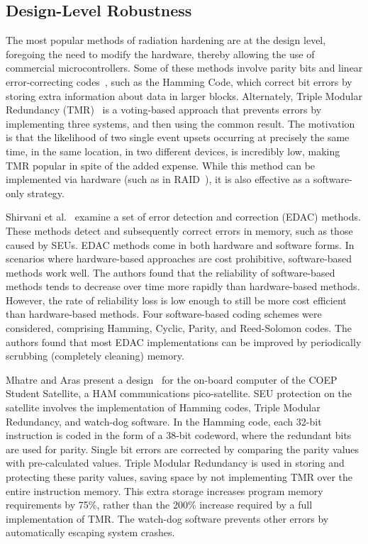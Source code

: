 \subsection{Design-Level Robustness}
\vspace{-5pt}
The most popular methods of radiation hardening are at the design level, foregoing the need to modify the hardware, thereby allowing the use of commercial microcontrollers.
Some of these methods involve parity bits and linear error-correcting codes~\cite{ErrorCorrectingCodes}, such as the Hamming Code, which correct bit errors by storing extra information about data in larger blocks.
Alternately, Triple Modular Redundancy (TMR)~\cite{TMR} is a voting-based approach that prevents errors by implementing three systems, and then using the common result.
The motivation is that the likelihood of two single event upsets occurring at precisely the same time, in the same location, in two different devices, is incredibly low, making TMR popular in spite of the added expense.
While this method can be implemented via hardware (such as in RAID~\cite{RAID}), it is also effective as a software-only strategy.

Shirvani et al.~\cite{Shirvani2001EDAC} examine a set of error detection and correction (EDAC) methods.
These methods detect and subsequently correct errors in memory, such as those caused by SEUs.
EDAC methods come in both hardware and software forms.
In scenarios where hardware-based approaches are cost prohibitive, software-based methods work well.
The authors found that the reliability of software-based methods tends to decrease over time more rapidly than hardware-based methods.
However, the rate of reliability loss is low enough to still be more cost efficient than hardware-based methods.
Four software-based coding schemes were considered, comprising Hamming, Cyclic, Parity, and Reed-Solomon codes.
The authors found that most EDAC implementations can be improved by periodically scrubbing (completely cleaning) memory.

Mhatre and Aras present a design~\cite{mhatreSeuTmr} for the on-board computer of the COEP Student Satellite, a HAM communications pico-satellite. 
SEU protection on the satellite involves the implementation of Hamming codes, Triple Modular Redundancy, and watch-dog software.
In the Hamming code, each 32-bit instruction is coded in the form of a 38-bit codeword, where the redundant bits are used for parity.
Single bit errors are corrected by comparing the parity values with pre-calculated values.
Triple Modular Redundancy is used in storing and protecting these parity values, saving space by not implementing TMR over the entire instruction memory.
This extra storage increases program memory requirements by 75\%, rather than the 200\% increase required by a full implementation of TMR.
The watch-dog software prevents other errors by automatically escaping system crashes.


